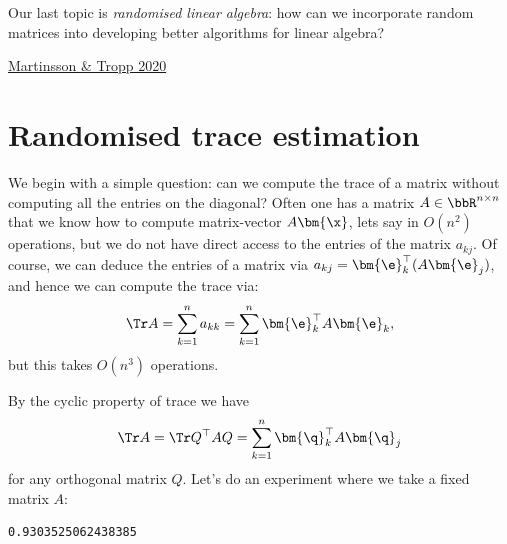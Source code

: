Our last topic is \emph{randomised linear algebra}: how can we incorporate random matrices into developing better algorithms for linear algebra?

\href{https://www.cambridge.org/core/services/aop-cambridge-core/content/view/4486926746CFF4547F42A2996C7DC09C/S0962492920000021a.pdf/div-class-title-randomized-numerical-linear-algebra-foundations-and-algorithms-div.pdf}{Martinsson \& Tropp 2020}

\section{Randomised trace estimation}
We begin with a simple question: can we compute the trace of a matrix without computing all the entries on the diagonal? Often one has a matrix $A \ensuremath{\in} \ensuremath{\bbR}^{n \ensuremath{\times} n}$ that we know how to compute matrix-vector $A\ensuremath{\bm{\x}}$, lets say in $O(n^2)$ operations, but we do not have direct access to the entries of the matrix $a_{kj}$. Of course, we can deduce the entries of a matrix via $a_{kj} = \ensuremath{\bm{\e}}_k^\ensuremath{\top} (A \ensuremath{\bm{\e}}_j)$, and hence we can compute the trace via:
\[
\Tr A = \ensuremath{\sum}_{k=1}^n a_{kk} = \ensuremath{\sum}_{k=1}^n \ensuremath{\bm{\e}}_k^\ensuremath{\top} A \ensuremath{\bm{\e}}_k,
\]
but this takes $O(n^3)$ operations. 

By the cyclic property of trace we have
\[
\Tr A = \Tr Q^\ensuremath{\top} A Q = \ensuremath{\sum}_{k=1}^n \ensuremath{\bm{\q}}_k^\ensuremath{\top} A \ensuremath{\bm{\q}}_j
\]
for any orthogonal matrix $Q$. Let's do an experiment where we take a fixed matrix $A$:


\begin{lstlisting}
0.9303525062438385
\end{lstlisting}



